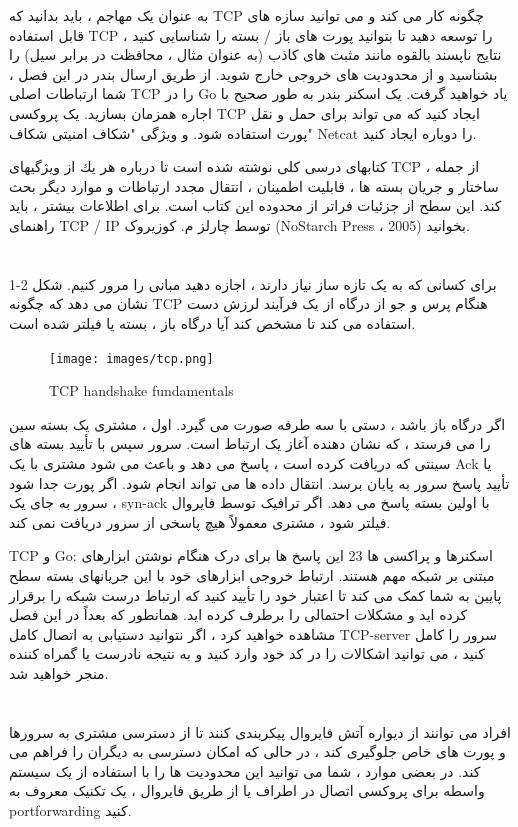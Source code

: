 \documentclass[12pt]{book}
\begin{document}
به عنوان یک مهاجم ، باید بدانید که TCP چگونه کار می کند و می توانید سازه های قابل استفاده TCP را توسعه دهید تا بتوانید پورت های باز / بسته را شناسایی کنید ، نتایج ناپسند بالقوه مانند مثبت های کاذب (به عنوان مثال ، محافظت در برابر سیل) را بشناسید و از محدودیت های خروجی خارج شوید. از طریق ارسال بندر در این فصل ، شما ارتباطات اصلی TCP را در Go یاد خواهید گرفت. یک اسکنر بندر به طور صحیح با اجاره همزمان بسازید. یک پروکسی TCP ایجاد کنید که می تواند برای حمل و نقل پورت استفاده شود. و ویژگی "شکاف امنیتی شکاف" Netcat را دوباره ایجاد کنید.

كتابهای درسی كلی نوشته شده است تا درباره هر یك از ویژگیهای TCP ، از جمله ساختار و جریان بسته ها ، قابلیت اطمینان ، انتقال مجدد ارتباطات و موارد دیگر بحث كند. این سطح از جزئیات فراتر از محدوده این کتاب است. برای اطلاعات بیشتر ، باید راهنمای TCP / IP توسط چارلز م. کوزیروک (NoStarch Press ، 2005) بخوانید.
\section{}
برای کسانی که به یک تازه ساز نیاز دارند ، اجازه دهید مبانی را مرور کنیم. شکل 2-1 نشان می دهد که چگونه TCP هنگام پرس و جو از درگاه از یک فرآیند لرزش دست استفاده می کند تا مشخص کند آیا درگاه باز ، بسته یا فیلتر شده است.
\begin{figure}
	\caption{TCP handshake fundamentals}
	\centering
	\texttt{[image: images/tcp.png]}
\end{figure}

اگر درگاه باز باشد ، دستی با سه طرفه صورت می گیرد. اول ، مشتری یک بسته سین را می فرستد ، که نشان دهنده آغاز یک ارتباط است. سرور سپس با تأیید بسته های سینتی که دریافت کرده است ، پاسخ می دهد و باعث می شود مشتری با یک Ack یا تأیید پاسخ سرور به پایان برسد. انتقال داده ها می تواند انجام شود. اگر پورت جدا شود ، سرور به جای یک syn-ack با اولین بسته پاسخ می دهد. اگر ترافیک توسط فایروال فیلتر شود ، مشتری معمولاً هیچ پاسخی از سرور دریافت نمی کند.

TCP و Go: اسکنرها و پراکسی ها 23 این پاسخ ها برای درک هنگام نوشتن ابزارهای مبتنی بر شبکه مهم هستند. ارتباط خروجی ابزارهای خود با این جریانهای بسته سطح پایین به شما کمک می کند تا اعتبار خود را تأیید کنید که ارتباط درست شبکه را برقرار کرده اید و مشکلات احتمالی را برطرف کرده اید. همانطور که بعداً در این فصل مشاهده خواهید کرد ، اگر نتوانید دستیابی به اتصال کامل TCP-server سرور را کامل کنید ، می توانید اشکالات را در کد خود وارد کنید و به نتیجه نادرست یا گمراه کننده منجر خواهید شد.
\section{}
افراد می توانند از دیواره آتش فایروال پیکربندی کنند تا از دسترسی مشتری به سرورها و پورت های خاص جلوگیری کند ، در حالی که امکان دسترسی به دیگران را فراهم می کند. در بعضی موارد ، شما می توانید این محدودیت ها را با استفاده از یک سیستم واسطه برای پروکسی اتصال در اطراف یا از طریق فایروال ، یک تکنیک معروف به portforwarding کنید.
\end{document}
